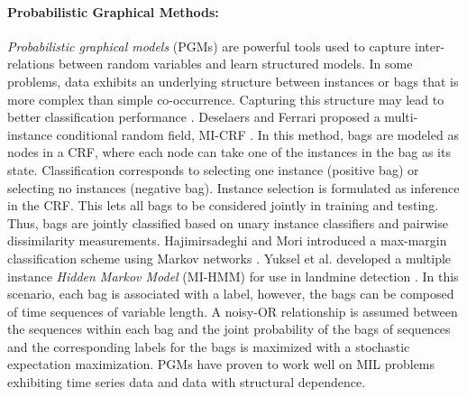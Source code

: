 \paragraph{Probabilistic Graphical Methods:}
\textit{Probabilistic graphical models} (PGMs) are powerful tools used to capture inter-relations between random variables and learn structured models. In some problems, data exhibits an underlying structure between instances or bags that is more complex than simple co-occurrence.  Capturing this structure may lead to better classification performance \citep{Carbonneau2016MILSurvey}.  Deselaers and Ferrari proposed a multi-instance conditional random field, MI-CRF \citep{Deselaers2010MICRF}.  In this method, bags are modeled as nodes in a CRF, where each node can take one of the instances in the bag as its state.  Classification corresponds to selecting one instance (positive bag) or selecting no instances (negative bag).  Instance selection is formulated as inference in the CRF.  This lets all bags to be considered jointly in training and testing.  Thus, bags are jointly classified based on unary instance classifiers and pairwise dissimilarity measurements.  Hajimirsadeghi and Mori introduced a max-margin classification scheme using Markov networks \citep{Hajimirsadeghi2017MIClassificationMarkovNetworks}.  Yuksel et al. developed a multiple instance \textit{Hidden Markov Model} (MI-HMM) for use in landmine detection \citep{Yuksel2015MIHMMLandmine,Yuksel2015MIHMMLandmine2}.  In this scenario, each bag is associated with a label, however, the bags can be composed of time sequences of variable length.  A noisy-OR relationship is assumed between the sequences within each bag and the joint probability of the bags of sequences and the corresponding labels for the bags is maximized with a stochastic expectation maximization.  PGMs have proven to work well on MIL problems exhibiting time series data and data with structural dependence.

